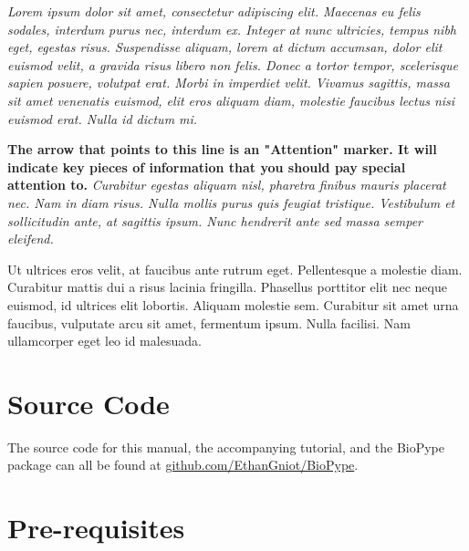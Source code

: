 \textit{Lorem ipsum dolor sit amet, consectetur adipiscing elit. Maecenas eu felis sodales, interdum purus nec, interdum ex. Integer at nunc  ultricies, tempus nibh eget, egestas risus. Suspendisse aliquam, lorem at dictum accumsan, dolor elit euismod velit, a gravida risus libero non felis. Donec a tortor tempor, scelerisque sapien posuere, volutpat erat. Morbi in imperdiet velit. Vivamus sagittis, massa sit amet venenatis euismod, elit eros aliquam diam, molestie faucibus lectus nisi euismod erat. Nulla id dictum mi.}

\attention \textbf{The arrow that points to this line is an "Attention" marker. It will indicate key pieces of information that you should pay special attention to.} \textit{Curabitur egestas aliquam nisl, pharetra finibus mauris placerat nec. Nam in diam risus. Nulla mollis purus quis feugiat tristique. Vestibulum et sollicitudin ante, at sagittis ipsum. Nunc hendrerit ante sed massa semper eleifend.}

 Ut ultrices eros velit, at faucibus ante rutrum eget. Pellentesque a molestie diam. Curabitur mattis dui a risus lacinia fringilla. Phasellus porttitor elit nec neque euismod, id ultrices elit lobortis. Aliquam molestie sem. Curabitur sit amet urna faucibus, vulputate arcu sit amet, fermentum ipsum. Nulla facilisi. Nam ullamcorper eget leo id malesuada.


\section{Source Code}
The source code for this manual, the accompanying tutorial, and the BioPype package can all be found at \url{github.com/EthanGniot/BioPype}.


\section{Pre-requisites}
